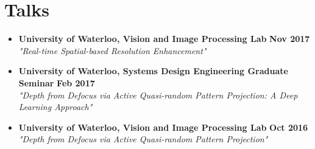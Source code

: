 \newpage
\section*{Talks}
\vspace{\postsubhead}
\begin{adjustwidth}{\indentleft}{\indentright}
  \begin{itemize}
    
    
    
    
    \item \textbf{University of Waterloo, Vision and Image Processing Lab}
    \hfill
    \textbf{Nov 2017}\\
    \textit{"Real-time Spatial-based Resolution Enhancement"}
    \vspace{\interlist}
    
    
    
    \item \textbf{University of Waterloo, Systems Design Engineering Graduate Seminar}
    \hfill
    \textbf{Feb 2017}\\
    \textit{"Depth from Defocus via Active Quasi-random Pattern Projection: A Deep Learning Approach"}
    \vspace{\interlist}
    
    \item \textbf{University of Waterloo, Vision and Image Processing Lab}
    \hfill
    \textbf{Oct 2016}\\
    \textit{"Depth from Defocus via Active Quasi-random Pattern Projection"}
    \vspace{\interlist}
    
  \end{itemize}
\end{adjustwidth}
